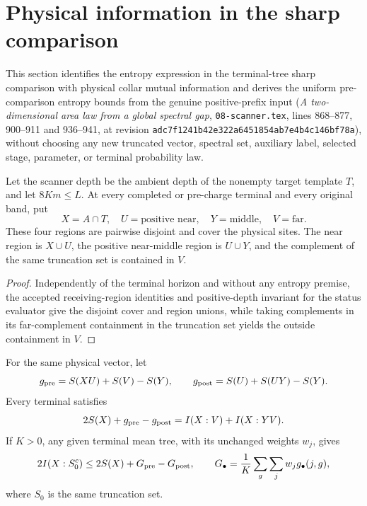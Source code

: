 \section{Physical information in the sharp comparison}
\label{sec:actual-collar-information}

This section identifies the entropy expression in the terminal-tree
sharp comparison with physical collar mutual information and derives
the uniform pre-comparison entropy bounds from the genuine positive-prefix
input (\emph{A two-dimensional area law from a global spectral gap},
\texttt{08-scanner.tex}, lines 868--877, 900--911 and 936--941, at revision
\texttt{adc7f1241b42e322a6451854ab7e4b4c146bf78a}), without choosing any new
truncated vector, spectral set, auxiliary label, selected stage, parameter,
or terminal probability law.

\begin{lemma}
    \label{thm:actual-terminal-collar-geometry}
    \leanok
    Let the scanner depth be the ambient depth of the nonempty target template
    $T$, and let $8Km\leq L$.  At every completed or pre-charge terminal
    and every original band, put
    \[
        X=A\cap T,\quad U=\text{positive near},\quad
        Y=\text{middle},\quad V=\text{far}.
    \]
    These four regions are pairwise disjoint and cover the physical sites.
    The near region is $X\cup U$, the positive near-middle region is
    $U\cup Y$, and the complement of the same truncation set is contained in $V$.
\end{lemma}

\begin{proof}
    \leanok
    Independently of the terminal horizon and without any entropy premise,
    the accepted receiving-region identities and positive-depth invariant
    for the status evaluator give the disjoint cover and region unions, while
    taking complements in its far-complement containment in the truncation set
    yields the outside containment in $V$.
\end{proof}

\begin{lemma}
    \label{thm:actual-terminal-information}
    \leanok
    For the same physical vector, let
    \[
        g_{\rm pre}=S(XU)+S(V)-S(Y),\qquad
        g_{\rm post}=S(U)+S(UY)-S(Y).
    \]
    Every terminal satisfies
    \[
        2S(X)+g_{\rm pre}-g_{\rm post}=I(X:V)+I(X:YV).
    \]
    If $K>0$, any given terminal mean tree, with its unchanged weights
    $w_j$, gives
    \[
        2I(X:S_0^c)\leq 2S(X)+G_{\rm pre}-G_{\rm post},\qquad
        G_\bullet=\frac1K\sum_g\sum_jw_jg_\bullet(j,g),
    \]
    where $S_0$ is the same truncation set.
\end{lemma}

